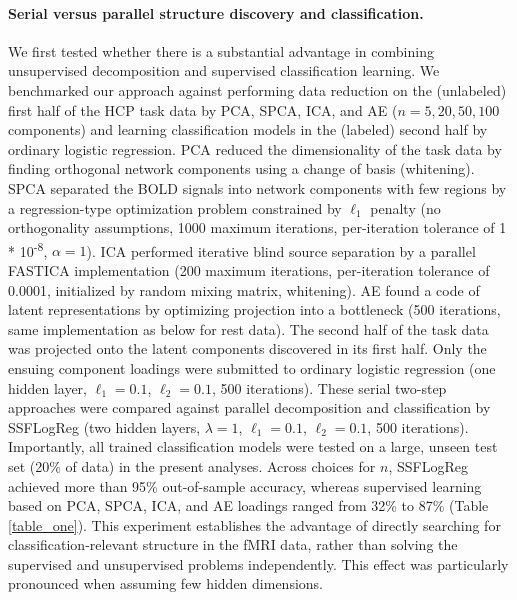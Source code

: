 \documentclass{article} %
\begin{document}
\paragraph{Serial versus parallel structure discovery and classification.}
We first tested whether there is a substantial advantage in combining unsupervised decomposition
and supervised classification learning.
We benchmarked our approach against
performing data reduction on the (unlabeled)
first half of the HCP task data by PCA, SPCA, ICA, and
AE ($n=5, 20, 50, 100$ components)
and learning classification models in the (labeled) second half
by ordinary logistic regression.
%
PCA reduced the dimensionality of the task data by
finding orthogonal network components using a change of basis
(whitening).
%
SPCA separated the BOLD signals into
network components with few regions by
a regression-type optimization problem constrained by
$\ell_1$ penalty
(no orthogonality assumptions, 1000 maximum iterations,
per-iteration tolerance of 1 * 10\textsuperscript{-8},
$\alpha=1$).
%
ICA performed iterative blind source separation
by a parallel FASTICA implementation (200 maximum iterations,
per-iteration tolerance of 0.0001,
initialized by random mixing matrix, whitening).
%
AE found a code of latent representations by optimizing projection
into a bottleneck
(500 iterations, same implementation as below for rest data).
%
The second half of the task data was projected onto the
latent components discovered in its first half.
Only the ensuing component loadings were submitted to ordinary
logistic regression
(one hidden layer, $\ell_1=0.1$, $\ell_2=0.1$, 500 iterations).
%
These serial two-step approaches were
compared against parallel decomposition and classification by SSFLogReg
(two hidden layers, $\lambda=1$, $\ell_1=0.1$, $\ell_2=0.1$,
500 iterations).
Importantly, all trained classification models were tested
on a large, unseen test set (20\% of data) in the present analyses.
%
Across choices for $n$, SSFLogReg
achieved more than 95\% out-of-sample accuracy, whereas
supervised learning based on PCA, SPCA, ICA, and AE loadings
ranged from 32\% to 87\%
(Table \ref{table_one}).
%
This experiment establishes the advantage of directly searching for
classification-relevant structure in the fMRI data,
rather than solving the supervised and unsupervised problems independently.
This effect was particularly pronounced when assuming few hidden dimensions.
\end{document}
